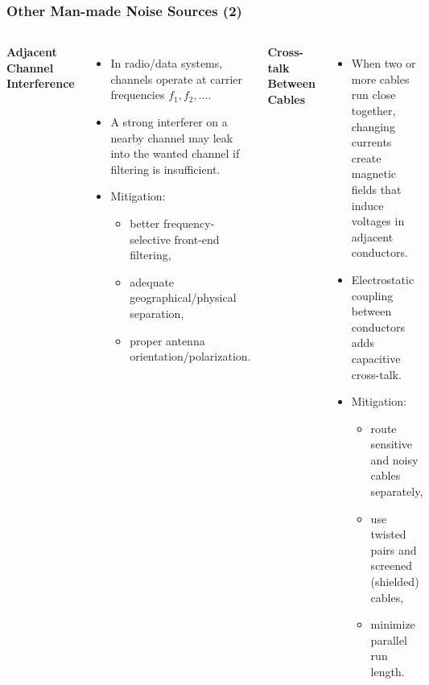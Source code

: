 \begin{frame}
	\frametitle{Other Man-made Noise Sources (2)}
	\begin{columns}
			\textbf{Adjacent Channel Interference}
			\begin{itemize}
				\item In radio/data systems, channels operate at carrier frequencies $f_1, f_2, \ldots$.
				\item A strong interferer on a nearby channel may leak into the wanted channel if filtering is insufficient.
				\item Mitigation:
				\begin{itemize}
					\item better frequency-selective front-end filtering,
					\item adequate geographical/physical separation,
					\item proper antenna orientation/polarization.
				\end{itemize}
			\end{itemize}
			\textbf{Cross-talk Between Cables}
			\begin{itemize}
				\item When two or more cables run close together, changing currents create magnetic fields that induce voltages in adjacent conductors.
				\item Electrostatic coupling between conductors adds capacitive cross-talk.
				\item Mitigation:
				\begin{itemize}
					\item route sensitive and noisy cables separately,
					\item use twisted pairs and screened (shielded) cables,
					\item minimize parallel run length.
				\end{itemize}
			\end{itemize}
	\end{columns}
\end{frame}

